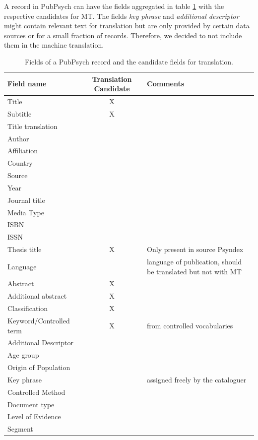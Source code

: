 \documentclass[a4paper,11pt]{article}
\begin{document}
A record in PubPsych can have the fields aggregated in table \ref{tab:fields} with the respective candidates for MT. The fields \textit{key phrase} and \textit{additional descriptor} might contain relevant text for translation but are only provided by certain data sources or for a small fraction of records. Therefore, we decided to not include them in the machine translation.
\begin{table}[h]
 \centering\textbf{}
\begin{tabular}[h]{lcp{5.7cm}}
    \toprule
    Field name & Translation Candidate & Comments \\
    \midrule
	Title & X &\\
	Subtitle & X &\\
	Title translation &  &\\
	Author &  &\\
 	Affiliation &  &\\
	Country &  &\\
 	Source & & \\
	Year & & \\
	Journal title & & \\
	Media Type & & \\
	ISBN &  &\\
	ISSN & & \\
	Thesis title & X & Only present in source Psyndex\\
	Language & & language of publication, should be translated but not with MT \\
	Abstract & X &\\
	Additional abstract & X &\\
	Classification & X &\\
	Keyword/Controlled term & X & from controlled vocabularies\\
	Additional Descriptor &  &\\
	Age group & & \\
	Origin of Population & & \\
	Key phrase & & assigned freely by the cataloguer\\
	Controlled Method & & \\
	Document type & & \\
	Level of Evidence & & \\
	Segment &  &\\
    \bottomrule
 \end{tabular}
  \caption{Fields of a PubPsych record and the candidate fields for translation.}
 \label{tab:fields}
\end{table}
\end{document}
